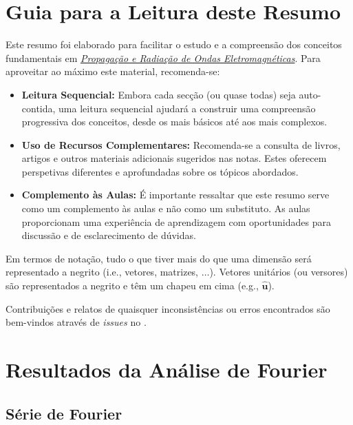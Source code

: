 \section*{Guia para a Leitura deste Resumo}

Este resumo foi elaborado para facilitar o estudo e a compreensão dos conceitos fundamentais em \href{https://fenix.tecnico.ulisboa.pt/disciplinas/PROE/2023-2024/1-semestre}{\textit{Propagação e Radiação de Ondas Eletromagnéticas}}. Para aproveitar ao máximo este material, recomenda-se:
\begin{itemize}
    \item \textbf{Leitura Sequencial:} Embora cada secção (ou quase todas) seja auto-contida, uma leitura sequencial ajudará a construir uma compreensão progressiva dos conceitos, desde os mais básicos até aos mais complexos.

    \item \textbf{Uso de Recursos Complementares:} Recomenda-se a consulta de livros, artigos e outros materiais adicionais sugeridos nas notas. Estes oferecem perspetivas diferentes e aprofundadas sobre os tópicos abordados.

    \item \textbf{Complemento às Aulas:} É importante ressaltar que este resumo serve como um complemento às aulas e não como um substituto. As aulas proporcionam uma experiência de aprendizagem com oportunidades para discussão e de esclarecimento de dúvidas.

\end{itemize}

Em termos de notação, tudo o que tiver mais do que uma dimensão será representado a negrito (i.e., vetores, matrizes, $\dots$). Vetores unitários (ou versores) são representados a negrito e têm um chapeu em cima (e.g., $\mathbf{\hat{u}}$).

Contribuições e relatos de quaisquer inconsistências ou erros encontrados são bem-vindos através de \textit{issues} no \href{https://github.com/kons-5/IST-PROE-Notes}{{\large \faGithub}}.

\section*{Resultados da Análise de Fourier}

\subsection*{Série de Fourier}

